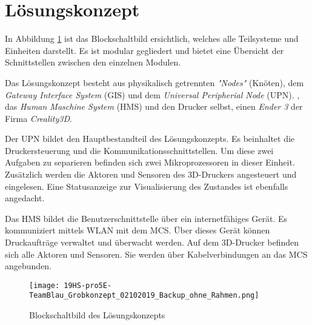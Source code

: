 \clearpage
\section{Lösungskonzept}\label{sec:Loesungskonzept}
In Abbildung \ref{img:Grobkonzept} ist das Blockschaltbild ersichtlich, welches alle Teilsysteme und Einheiten darstellt. Es ist modular gegliedert und bietet eine Übersicht der Schnittstellen zwischen den einzelnen Modulen. 

Das Lösungskonzept besteht aus physikalisch getrennten \textit{"Nodes"} (Knöten), dem \textit{Gateway Interface System} (GIS) und dem \textit{Universal Peripherial Node} (UPN). , das \textit{Human Maschine System} (HMS) und den Drucker selbst, einen \textit{Ender 3} der Firma \textit{Creality3D}. 

Der UPN bildet den Hauptbestandteil des Lösungskonzepts. Es beinhaltet die Druckersteuerung und die Kommunikationsschnittstellen. Um diese zwei Aufgaben zu separieren befinden sich zwei Mikroprozessoren in dieser Einheit. Zusätzlich werden die Aktoren und Sensoren des 3D-Druckers  angesteuert und eingelesen. Eine Statusanzeige zur Visualisierung des Zustandes ist ebenfalls angedacht.

Das HMS bildet die Benutzerschnittstelle über ein internetfähiges Gerät. Es kommuniziert mittels WLAN mit dem MCS. Über dieses Gerät können Druckaufträge verwaltet und überwacht werden. Auf dem 3D-Drucker befinden sich alle Aktoren und Sensoren. Sie werden über Kabelverbindungen an das MCS angebunden.



\begin{figure}
	\centering
	\texttt{[image: 19HS-pro5E-TeamBlau\_Grobkonzept\_02102019\_Backup\_ohne\_Rahmen.png]}
	\caption{Blockschaltbild des Lösungskonzepts}
	\label{img:Grobkonzept}
\end{figure} 








